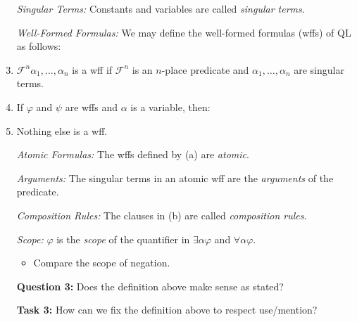 \documentclass[a4paper, 11pt]{article} %
\begin{document}
\begin{enumerate}
  \item[\it Singular Terms:] Constants and variables are called \textit{singular terms}.
  \item[\it Well-Formed Formulas:] We may define the well-formed formulas (wffs) of QL as follows:
  \item $\mathcal{F}^n\alpha_1,\ldots,\alpha_n$ is a wff if $\mathcal{F}^n$ is an $n$-place predicate and $\alpha_1,\ldots,\alpha_n$ are singular terms.
  \item If $\varphi$ and $\psi$ are wffs and $\alpha$ is a variable, then:
    \begin{enumerate}
    \end{enumerate}
  \item Nothing else is a wff.
  \item[\it Atomic Formulas:] The wffs defined by (a) are \textit{atomic}.
  \item[\it Arguments:] The singular terms in an atomic wff are the \textit{arguments} of the predicate.
  \item[\it Composition Rules:] The clauses in (b) are called \textit{composition rules}.
  \item[\it Scope:] $\varphi$ is the \textit{scope} of the quantifier in $\exists \alpha \varphi$ and $\forall \alpha \varphi$.
    \begin{itemize}
      \item Compare the scope of negation.
    \end{itemize}
  \item[\bf Question 3:] Does the definition above make sense as stated?
  \item[\bf Task 3:] How can we fix the definition above to respect use/mention?
\end{enumerate}
\end{document}
